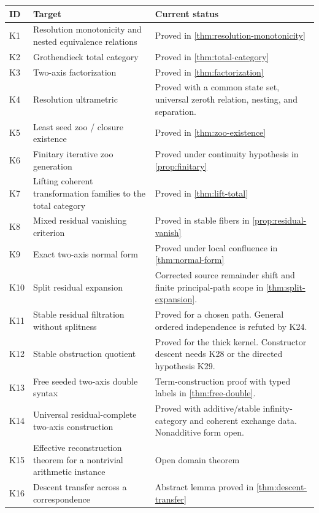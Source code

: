 \documentclass[11pt]{article}
\theoremstyle{definition}
\theoremstyle{remark}
\begin{document}
\begin{longtable}{>{\raggedright\arraybackslash}p{} >{\raggedright\arraybackslash}p{} >{\raggedright\arraybackslash}p{}}
\toprule
ID & Target & Current status\\
\midrule
\endhead
K1 & Resolution monotonicity and nested equivalence relations & Proved in \cref{thm:resolution-monotonicity}\\
K2 & Grothendieck total category & Proved in \cref{thm:total-category}\\
K3 & Two-axis factorization & Proved in \cref{thm:factorization}\\
K4 & Resolution ultrametric & Proved with a common state set, universal zeroth relation, nesting, and separation.\\
K5 & Least seed zoo / closure existence & Proved in \cref{thm:zoo-existence}\\
K6 & Finitary iterative zoo generation & Proved under continuity hypothesis in \cref{prop:finitary}\\
K7 & Lifting coherent transformation families to the total category & Proved in \cref{thm:lift-total}\\
K8 & Mixed residual vanishing criterion & Proved in stable fibers in \cref{prop:residual-vanish}\\
K9 & Exact two-axis normal form & Proved under local confluence in \cref{thm:normal-form}\\
K10 & Split residual expansion & Corrected source remainder shift and finite principal-path scope in \cref{thm:split-expansion}.\\
K11 & Stable residual filtration without splitness & Proved for a chosen path. General ordered independence is refuted by K24.\\
K12 & Stable obstruction quotient & Proved for the thick kernel. Constructor descent needs K28 or the directed hypothesis K29.\\
K13 & Free seeded two-axis double syntax & Term-construction proof with typed labels in \cref{thm:free-double}.\\
K14 & Universal residual-complete two-axis construction & Proved with additive/stable infinity-category and coherent exchange data. Nonadditive form open.\\
K15 & Effective reconstruction theorem for a nontrivial arithmetic instance & Open domain theorem\\
K16 & Descent transfer across a correspondence & Abstract lemma proved in \cref{thm:descent-transfer}\\

\end{longtable}
\end{document}
